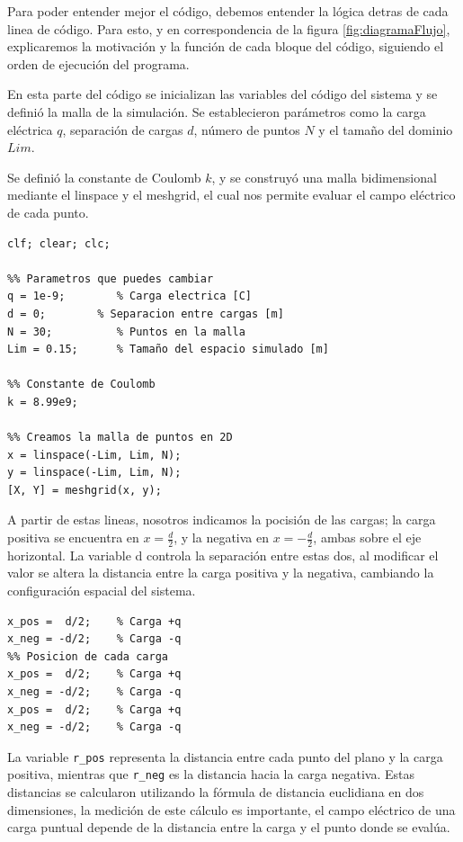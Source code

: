 
\tab Para poder entender mejor el código, debemos entender la lógica detras de cada linea de código. Para esto, y en correspondencia de la figura \ref{fig:diagramaFlujo}, explicaremos la motivación y la función de cada bloque del código, siguiendo el orden de ejecución del programa.

\tab En esta parte del código se inicializan las variables del código del sistema y se definió la malla de la simulación. Se establecieron parámetros como la carga eléctrica $q$, separación de cargas $d$, número de puntos $N$ y el tamaño del dominio $Lim$.

\tab Se definió la constante de Coulomb $k$, y se construyó una malla bidimensional mediante el linspace y el meshgrid, el cual nos permite evaluar el campo eléctrico de cada punto.

\begin{lstlisting}[style=Matlab-editor]
clf; clear; clc;

%% Parametros que puedes cambiar
q = 1e-9;        % Carga electrica [C]
d = 0;        % Separacion entre cargas [m]
N = 30;          % Puntos en la malla
Lim = 0.15;      % Tamaño del espacio simulado [m]

%% Constante de Coulomb
k = 8.99e9;

%% Creamos la malla de puntos en 2D
x = linspace(-Lim, Lim, N);
y = linspace(-Lim, Lim, N);
[X, Y] = meshgrid(x, y);
\end{lstlisting}

\tab A partir de estas lineas, nosotros  indicamos la pocisión de las cargas; la carga positiva se encuentra en $x=\frac{d}{2}$, y la negativa en $x=-\frac{d}{2}$, ambas sobre el eje horizontal. La variable d controla la separación entre estas dos, al modificar el valor se altera la distancia entre la carga positiva y la negativa, cambiando la configuración espacial del sistema.

\begin{lstlisting}[style=Matlab-editor]
x_pos =  d/2;    % Carga +q
x_neg = -d/2;    % Carga -q
%% Posicion de cada carga
x_pos =  d/2;    % Carga +q
x_neg = -d/2;    % Carga -q
x_pos =  d/2;    % Carga +q
x_neg = -d/2;    % Carga -q
\end{lstlisting}

\tab La variable \verb|r_pos| representa la distancia entre cada punto del plano y la carga positiva, mientras que \verb|r_neg| es la distancia hacia la carga negativa. Estas distancias se calcularon utilizando la fórmula de distancia euclidiana en dos dimensiones, la medición de este cálculo es importante, el campo eléctrico de una carga puntual depende de la distancia entre la carga y el punto donde se evalúa.

